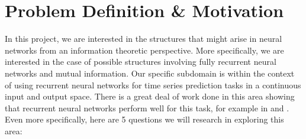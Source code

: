 \begin{titlepage}



 

\vfill %

\end{titlepage}



\section{Problem Definition \& Motivation}

In this project, we are interested in the structures that might arise in neural
networks from an information theoretic perspective. More specifically, we are
interested in the case of possible structures involving fully recurrent neural
networks and mutual information. Our specific subdomain is within the context of
using recurrent neural networks for time series prediction tasks in a continuous
input and output space. There is a great deal of work done in this area showing
that recurrent neural networks perform well for this task, for example in
\cite{rnn_time_series} and \cite{rnn_stocks}. Even more specifically, here are 5 questions we will research in exploring this area:

